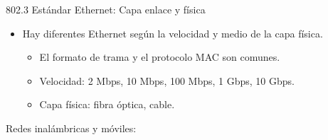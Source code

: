 \documentclass[12pt, twoside, openright]{report} %
\begin{document}
802.3 Estándar Ethernet: Capa enlace y física

\begin{itemize}
	\item Hay diferentes Ethernet según la velocidad y medio de la capa
	      física.

	      \begin{itemize}
		      \item El formato de trama y el protocolo MAC son comunes.
		      \item Velocidad: 2 Mbps, 10 Mbps, 100 Mbps, 1 Gbps, 10 Gbps.
		      \item Capa física: fibra óptica, cable.
	      \end{itemize}
\end{itemize}

Redes inalámbricas y móviles:
\end{document}
